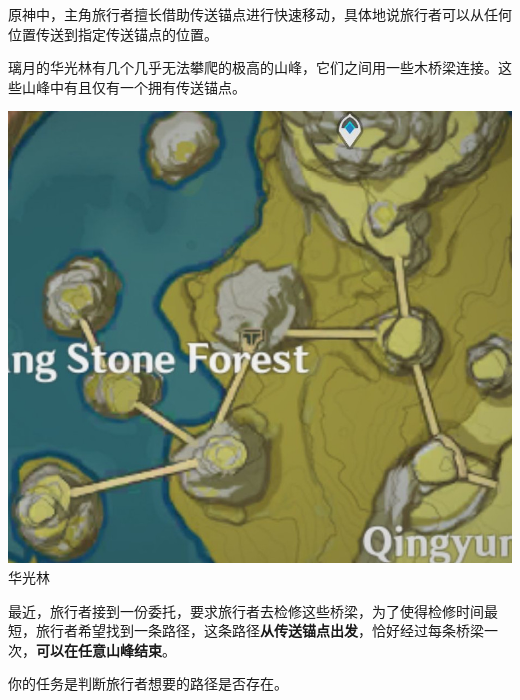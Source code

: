 原神中，主角旅行者擅长借助传送锚点进行快速移动，具体地说旅行者可以从任何位置传送到指定传送锚点的位置。

璃月的华光林有几个几乎无法攀爬的极高的山峰，它们之间用一些木桥梁连接。这些山峰中有且仅有一个拥有传送锚点。

\begin{center}
  \includegraphics[scale=0.8]{path.jpg} \\
  \small{华光林}
\end{center}

最近，旅行者接到一份委托，要求旅行者去检修这些桥梁，为了使得检修时间最短，旅行者希望找到一条路径，这条路径\textbf{从传送锚点出发}，恰好经过每条桥梁一次，\textbf{可以在任意山峰结束}。

你的任务是判断旅行者想要的路径是否存在。